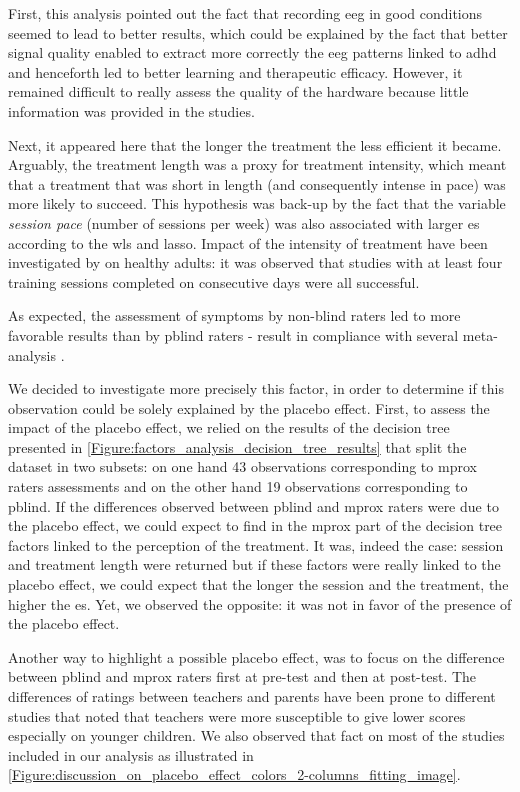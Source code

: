 First, this analysis pointed out the fact that recording \gls{eeg} in good conditions seemed to lead to better results, 
which could be explained by the fact that better signal quality enabled to extract more correctly the \gls{eeg} 
patterns linked to \gls{adhd} and henceforth led to better learning and therapeutic efficacy. However, it remained difficult to 
really assess the quality of the hardware because little information was provided in the studies.  

Next, it appeared here that the longer the treatment the less efficient it became. Arguably, the treatment length was a proxy 
for treatment intensity, which meant that a treatment that was short in length (and consequently intense in pace) 
was more likely to succeed. This hypothesis was back-up by the fact that the variable \emph{session pace} (number of sessions per week) 
was also associated with larger \gls{es} according to the \gls{wls} and \gls{lasso}. Impact of the intensity of treatment have been investigated
by \citep{Rogala2016} on healthy adults: it was observed that studies with at least four training sessions completed on consecutive days were all successful. 

As expected, the assessment of symptoms by non-blind raters led to more favorable results than by \gls{pblind} raters - 
result in compliance with several meta-analysis \citep{Cortese2016, Micoulaud2014}. 

We decided to investigate more precisely this factor, in order to determine if this observation could be solely explained by
the placebo effect. First, to assess the impact of the placebo effect, we relied on the results of the decision tree 
presented in \cref{Figure:factors_analysis_decision_tree_results} that split the dataset in two subsets: on one hand 43 observations corresponding 
to \gls{mprox} raters assessments and on the other hand 19 observations corresponding to \gls{pblind}. If the differences observed 
between \gls{pblind} and \gls{mprox} raters were due to the placebo effect, we could expect to find in the \gls{mprox} part of the decision 
tree factors linked to the perception of the treatment. It was, indeed the case: session and treatment length were returned but if
these factors were really linked to the placebo effect, we could expect that the longer the session and the treatment, the higher the \gls{es}. 
Yet, we observed the opposite: it was not in favor of the presence of the placebo effect. 

Another way to highlight a possible placebo effect, was to focus on the difference between \gls{pblind} and \gls{mprox} raters first at pre-test 
and then at post-test. The differences of ratings between teachers and parents have been prone to different studies \citep{Sollie2013, Narad2015, Minder2018}
that noted that teachers were more susceptible to give lower scores especially on younger children. We also observed that fact on most of the studies included 
in our analysis as illustrated in \cref{Figure:discussion_on_placebo_effect_colors_2-columns_fitting_image}.  

